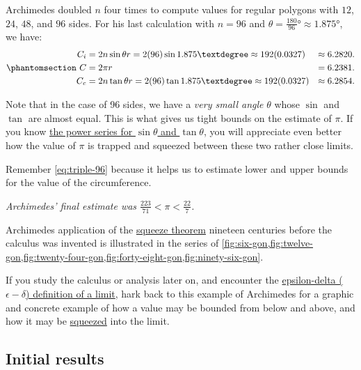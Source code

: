 \documentclass[
  a4paper,
]{article}
\begin{document}
Archimedes doubled \(n\) four times to compute values for regular
polygons with \(12\), \(24\), \(48\), and \(96\) sides. For his last
calculation with \(n = 96\) and
\(\theta = \tfrac{180}{96}° \approx 1.875°\), we have:
\begin{equation}\phantomsection\label{eq:triple-96}{
\begin{aligned}
C_i &= 2n\sin\theta r = 2(96)\sin{1.875°} \approx 192(0.0327) &\approx 6.2820.\\
C &= 2\pi r &= 6.2381.\\
C_c &= 2n\tan\theta r = 2(96)\tan{1.875°} \approx 192(0.0327) &\approx 6.2854.\\
\end{aligned}
}\end{equation}

Note that in the case of 96 sides, we have a \emph{very small angle}
\(\theta\) whose \(\sin\) and \(\tan\) are almost equal. This is what
gives us tight bounds on the estimate of \(\pi\). If you know
\href{https://math.libretexts.org/Bookshelves/Differential_Equations/A_First_Course_in_Differential_Equations_for_Scientists_and_Engineers_(Herman)/08:_Appendix_Calculus_Review/8.07:_Power_Series}{the
power series for \(\sin\theta\) and \(\tan\theta\)}, you will appreciate
even better how the value of \(\pi\) is trapped and squeezed between
these two rather close limits.

Remember \cref{eq:triple-96} because it helps us to estimate lower and
upper bounds for the value of the circumference.

\emph{Archimedes' final estimate was
\(\frac{223}{71} < \pi < \frac{22}{7}\).}

Archimedes application of the
\href{https://en.wikipedia.org/wiki/Squeeze_theorem}{squeeze theorem}
nineteen centuries before the calculus was invented is illustrated in
the series of
\cref{fig:six-gon,fig:twelve-gon,fig:twenty-four-gon,fig:forty-eight-gon,fig:ninety-six-gon}.

If you study the calculus or analysis later on, and encounter the
\href{https://en.wikipedia.org/wiki/Limit_of_a_function}{epsilon-delta
(\(\epsilon-\delta\)) definition of a limit}, hark back to this example
of Archimedes for a graphic and concrete example of how a value may be
bounded from below and above, and how it may be
\href{https://demonstrations.wolfram.com/SqueezeTheorem/}{squeezed} into
the limit.

\subsection{Initial results}\label{initial-results}
\end{document}
